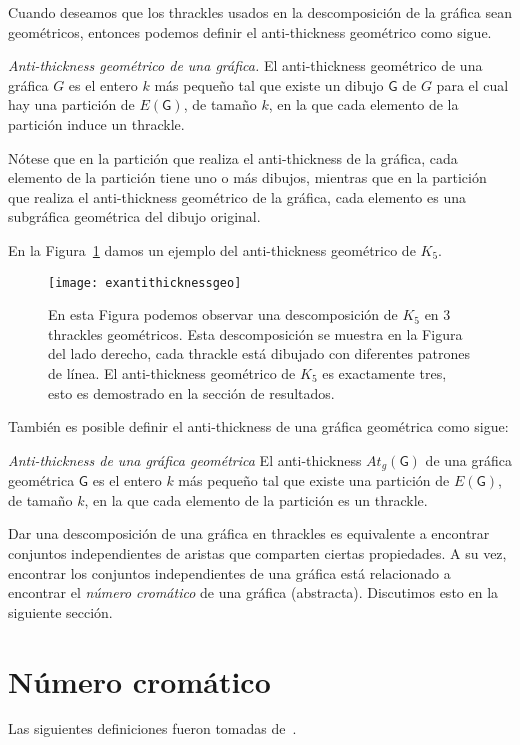 Cuando deseamos que los thrackles usados en la descomposición de la gráfica sean
geométricos, entonces podemos definir el anti-thickness geométrico como sigue.
\begin{definition}{\emph{Anti-thickness geométrico de una gráfica.}}
El anti-thickness geométrico de una gráfica $G$ es el entero $k$ más pequeño
tal que existe un dibujo $\mathsf{G}$ de $G$ para el cual hay una partición de
$E(\mathsf{G})$, de tamaño $k$, en la que cada elemento de la partición induce
un thrackle.
\end{definition}
Nótese que en la partición que realiza el anti-thickness de la gráfica, cada
elemento de la partición tiene uno o más dibujos, mientras que en la partición
que realiza el anti-thickness geométrico de la gráfica, cada elemento es una
subgráfica geométrica del dibujo original.

En la Figura~\ref{fig:exantithicknessgeo} damos un ejemplo del anti-thickness
geométrico de $K_5$.
\begin{figure}[htpb]
  \centering
  \texttt{[image: exantithicknessgeo]}
  \caption{En esta Figura podemos observar una descomposición de $K_5$ en 3
  thrackles geométricos. Esta descomposición se muestra en la Figura del lado
  derecho, cada thrackle está dibujado con diferentes patrones de línea. El
  anti-thickness geométrico de $K_5$ es exactamente tres, esto es demostrado en
  la sección de resultados.} %
  \label{fig:exantithicknessgeo}
\end{figure}

También es posible definir el anti-thickness de una gráfica geométrica como sigue:
\begin{definition}{\emph{Anti-thickness de una gráfica geométrica}}
  \label{definicion:at_dibujo}
  El anti-thickness $At_g(\mathsf{G})$ de una gráfica geométrica $\mathsf{G}$
  es el entero $k$ más pequeño tal que existe una partición de $E(\mathsf{G})$, de tamaño $k$, en la que cada elemento de la partición es un thrackle.
\end{definition}

Dar una descomposición de una gráfica en thrackles es equivalente a encontrar
conjuntos independientes de aristas que comparten ciertas propiedades. A su vez,
encontrar los conjuntos independientes de una gráfica está relacionado a
encontrar el \emph{número cromático} de una gráfica (abstracta). Discutimos
esto en la siguiente sección.

\section{Número cromático}
Las siguientes definiciones fueron tomadas de~\cite{Chartrand2008}.

